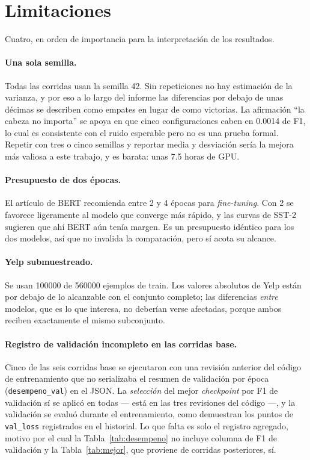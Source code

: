 \section{Limitaciones}
\label{sec:limitaciones}

Cuatro, en orden de importancia para la interpretación de los resultados.

\paragraph{Una sola semilla.} Todas las corridas usan la semilla 42. Sin
repeticiones no hay estimación de la varianza, y por eso a lo largo del
informe las diferencias por debajo de unas décimas se describen como empates
en lugar de como victorias. La afirmación ``la cabeza no importa'' se apoya en
que cinco configuraciones caben en \num{0,0014} de F1, lo cual es consistente
con el ruido esperable pero no es una prueba formal. Repetir con tres o cinco
semillas y reportar media y desviación sería la mejora más valiosa a este
trabajo, y es barata: unas \num{7,5} horas de GPU.

\paragraph{Presupuesto de dos épocas.} El artículo de BERT recomienda entre 2
y 4 épocas para \textit{fine-tuning}. Con 2 se favorece ligeramente al modelo
que converge más rápido, y las curvas de SST-2 sugieren que ahí BERT aún
tenía margen. Es un presupuesto idéntico para los dos modelos, así que no
invalida la comparación, pero sí acota su alcance.

\paragraph{Yelp submuestreado.} Se usan \num{100000} de \num{560000} ejemplos
de train. Los valores absolutos de Yelp están por debajo de lo alcanzable con
el conjunto completo; las diferencias \emph{entre} modelos, que es lo que
interesa, no deberían verse afectadas, porque ambos reciben exactamente el
mismo subconjunto.

\paragraph{Registro de validación incompleto en las corridas base.} Cinco de
las seis corridas base se ejecutaron con una revisión anterior del código de
entrenamiento que no serializaba el resumen de validación por época
(\texttt{desempeno\_val}) en el JSON. La \emph{selección} del mejor
\textit{checkpoint} por F1 de validación sí se aplicó en todas --- está en
las tres revisiones del código ---, y la validación se evaluó durante el
entrenamiento, como demuestran los puntos de \texttt{val\_loss} registrados en
el historial. Lo que falta es solo el registro agregado, motivo por el cual la
Tabla~\ref{tab:desempeno} no incluye columna de F1 de validación y la
Tabla~\ref{tab:mejor}, que proviene de corridas posteriores, sí.
